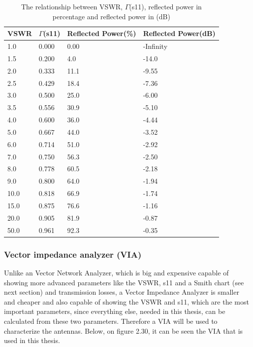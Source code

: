 \begin{table}[h!]
\centering
\begin{tabular}{|l|l|l|l|}
\hline
VSWR & $\Gamma$(s11) & Reflected Power(\%) & Reflected Power(dB) \\\hline
1.0  & 0.000          & 0.00  & -Infinity     \\ \hline
1.5  & 0.200          & 4.0   & -14.0         \\ \hline
2.0  & 0.333          & 11.1  & -9.55         \\ \hline
2.5  & 0.429          & 18.4  & -7.36         \\ \hline
3.0  & 0.500          & 25.0  & -6.00         \\ \hline
3.5  & 0.556          & 30.9  & -5.10         \\ \hline
4.0  & 0.600          & 36.0  & -4.44         \\ \hline
5.0  & 0.667          & 44.0  & -3.52         \\ \hline
6.0  & 0.714          & 51.0  & -2.92         \\ \hline
7.0  & 0.750          & 56.3  & -2.50         \\ \hline
8.0  & 0.778          & 60.5  & -2.18         \\ \hline
9.0  & 0.800          & 64.0  & -1.94         \\ \hline
10.0 & 0.818          & 66.9  & -1.74         \\ \hline
15.0 & 0.875          & 76.6  & -1.16         \\ \hline
20.0 & 0.905          & 81.9  & -0.87         \\ \hline
50.0 & 0.961          & 92.3  & -0.35         \\ \hline
\end{tabular}
\caption{The relationship between VSWR, $\Gamma$(s11), reflected power in percentage and reflected power in (dB)}
\end{table}
\subsubsection{Vector impedance analyzer (VIA)}
 Unlike an Vector Network Analyzer, which is big and expensive capable of showing more advanced parameters like the VSWR, s11 and a Smith chart (see next section) and transmission losses, a Vector Impedance Analyzer is smaller and cheaper and also capable of showing the VSWR and s11, which are the most important parameters, since everything else, needed in this thesis, can be calculated from these two parameters. Therefore a VIA will be used to characterize the antennas. Below, on figure 2.30, it can be seen the VIA that is used in this thesis.
 
